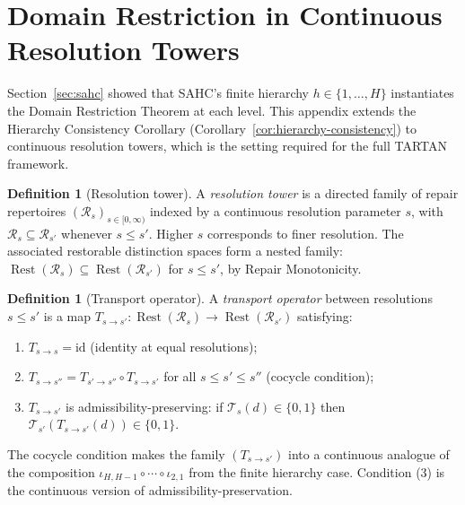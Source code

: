 \documentclass[12pt, oneside]{article}
\theoremstyle{plain}
\theoremstyle{definition}
\newtheorem{definition}[theorem]{Definition}
\theoremstyle{remark}
\DeclareMathOperator{\Rest}{Rest}
\newcommand{\Tsub}{\mathcal{T}}
\newcommand{\iotamap}{\iota}        %
\begin{document}
\section{Domain Restriction in Continuous Resolution Towers}
\label{app:tartan}

Section~\ref{sec:sahc} showed that SAHC's finite hierarchy
$h \in \{1, \ldots, H\}$ instantiates the Domain Restriction
Theorem at each level.
This appendix extends the Hierarchy Consistency Corollary
(Corollary~\ref{cor:hierarchy-consistency}) to continuous resolution
towers, which is the setting required for the full TARTAN
framework.

\begin{definition}[Resolution tower]
  A \emph{resolution tower} is a directed family of repair
  repertoires $(\mathcal{R}_s)_{s \in [0,\infty)}$ indexed by
  a continuous resolution parameter $s$, with
  $\mathcal{R}_s \subseteq \mathcal{R}_{s'}$ whenever $s \leq s'$.
  Higher $s$ corresponds to finer resolution.
  The associated restorable distinction spaces form a nested family:
  $\Rest(\mathcal{R}_s) \subseteq \Rest(\mathcal{R}_{s'})$
  for $s \leq s'$, by Repair Monotonicity.
\end{definition}

\begin{definition}[Transport operator]
  A \emph{transport operator} between resolutions $s \leq s'$
  is a map $T_{s \to s'}: \Rest(\mathcal{R}_s) \to
  \Rest(\mathcal{R}_{s'})$ satisfying:
  \begin{enumerate}
    \item $T_{s \to s} = \mathrm{id}$ (identity at equal resolutions);
    \item $T_{s \to s''} = T_{s' \to s''} \circ T_{s \to s'}$
      for all $s \leq s' \leq s''$ (cocycle condition);
    \item $T_{s \to s'}$ is admissibility-preserving: if
      $\Tsub_s(d) \in \{0,1\}$ then $\Tsub_{s'}(T_{s \to s'}(d))
      \in \{0,1\}$.
  \end{enumerate}
\end{definition}

The cocycle condition makes the family $(T_{s \to s'})$ into a
continuous analogue of the composition
$\iotamap_{H,H-1} \circ \cdots \circ \iotamap_{2,1}$
from the finite hierarchy case.
Condition (3) is the continuous version of admissibility-preservation.
\end{document}
